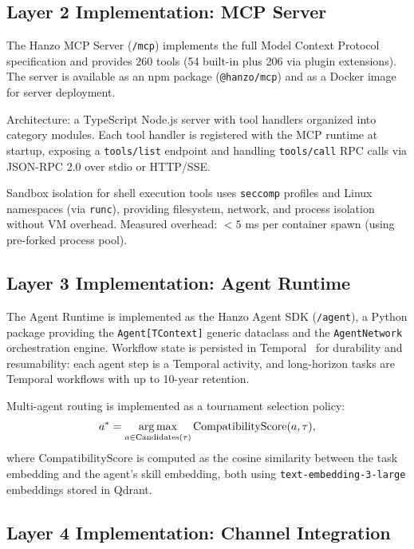 \subsection{Layer 2 Implementation: MCP Server}

The Hanzo MCP Server (\texttt{/mcp}) implements the full Model Context
Protocol specification and provides 260 tools (54 built-in plus 206 via
plugin extensions). The server is available as an npm package
(\texttt{@hanzo/mcp}) and as a Docker image for server deployment.

Architecture: a TypeScript Node.js server with tool handlers organized into
category modules. Each tool handler is registered with the MCP runtime at
startup, exposing a \texttt{tools/list} endpoint and handling
\texttt{tools/call} RPC calls via JSON-RPC 2.0 over stdio or HTTP/SSE.

Sandbox isolation for shell execution tools uses
\texttt{seccomp} profiles and Linux namespaces (via \texttt{runc}), providing
filesystem, network, and process isolation without VM overhead. Measured
overhead: $<5$ ms per container spawn (using pre-forked process pool).

\subsection{Layer 3 Implementation: Agent Runtime}

The Agent Runtime is implemented as the Hanzo Agent SDK (\texttt{/agent}),
a Python package providing the \texttt{Agent[TContext]} generic dataclass
and the \texttt{AgentNetwork} orchestration engine. Workflow state is
persisted in Temporal~\cite{temporal2023} for durability and resumability:
each agent step is a Temporal activity, and long-horizon tasks are Temporal
workflows with up to 10-year retention.

Multi-agent routing is implemented as a tournament selection policy:
\begin{equation}
    a^* = \operatorname*{arg\,max}_{a \in \text{Candidates}(\tau)}
          \text{CompatibilityScore}(a, \tau),
\end{equation}
where $\text{CompatibilityScore}$ is computed as the cosine similarity
between the task embedding and the agent's skill embedding, both using
\texttt{text-embedding-3-large} embeddings stored in Qdrant.

\subsection{Layer 4 Implementation: Channel Integration}


